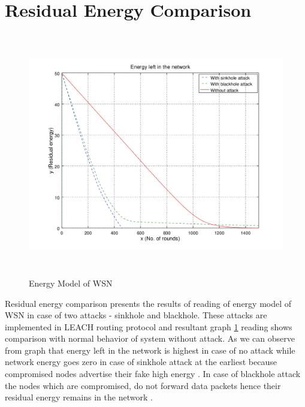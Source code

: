 \section{Residual Energy Comparison}
    \begin{figure}[ht]
     \centering
     \includegraphics[width=5in, height=4.2in] {Figures/PNG/energy.png}
     \caption{Energy Model of WSN}
     \label{energy}
    \end{figure}
Residual energy comparison presents the results of reading of energy model of WSN in case of two attacks - sinkhole and blackhole. These attacks are implemented in LEACH routing protocol and resultant graph \ref{energy} reading shows comparison with normal behavior of system without attack. As we can observe from graph that energy left in the network is highest in case of no attack while network energy goes zero in case of sinkhole attack at the earliest because compromised nodes advertise their fake high energy \cite{salehi2013detection}. In case of blackhole attack the nodes which are compromised, do not forward data packets hence their residual energy remains in the network \cite{wazid2013detection}.  
